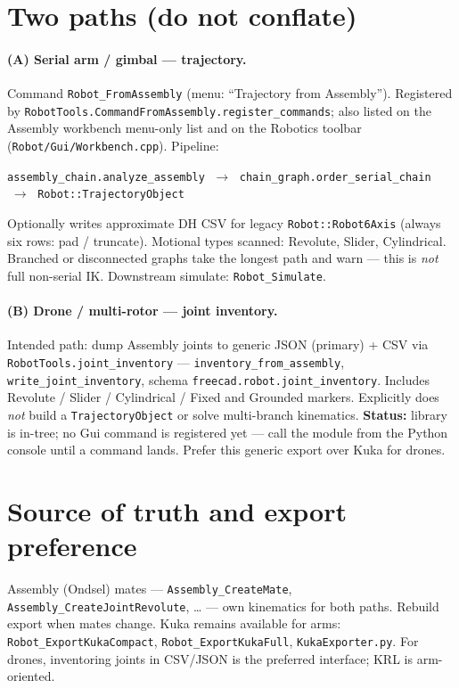 \section*{Two paths (do not conflate)}

\paragraph{(A) Serial arm / gimbal --- trajectory.}
Command \texttt{Robot\_FromAssembly} (menu: ``Trajectory from Assembly''). Registered by \texttt{RobotTools.CommandFromAssembly.register\_commands}; also listed on the Assembly workbench menu-only list and on the Robotics toolbar (\texttt{Robot/Gui/Workbench.cpp}). Pipeline:
\begin{center}
\texttt{assembly\_chain.analyze\_assembly}
$\;\to\;$
\texttt{chain\_graph.order\_serial\_chain}
$\;\to\;$
\texttt{Robot::TrajectoryObject}
\end{center}
Optionally writes approximate DH CSV for legacy \texttt{Robot::Robot6Axis} (always six rows: pad / truncate). Motional types scanned: Revolute, Slider, Cylindrical. Branched or disconnected graphs take the longest path and warn --- this is \emph{not} full non-serial IK. Downstream simulate: \texttt{Robot\_Simulate}.

\paragraph{(B) Drone / multi-rotor --- joint inventory.}
Intended path: dump Assembly joints to generic JSON (primary) + CSV via \texttt{RobotTools.joint\_inventory} --- \texttt{inventory\_from\_assembly}, \texttt{write\_joint\_inventory}, schema \texttt{freecad.robot.joint\_inventory}. Includes Revolute / Slider / Cylindrical / Fixed and Grounded markers. Explicitly does \emph{not} build a \texttt{TrajectoryObject} or solve multi-branch kinematics. \textbf{Status:} library is in-tree; no Gui command is registered yet --- call the module from the Python console until a command lands. Prefer this generic export over Kuka for drones.

\section*{Source of truth and export preference}

Assembly (Ondsel) mates --- \texttt{Assembly\_CreateMate}, \texttt{Assembly\_CreateJointRevolute}, \ldots{} --- own kinematics for both paths. Rebuild export when mates change. Kuka remains available for arms: \texttt{Robot\_ExportKukaCompact}, \texttt{Robot\_ExportKukaFull}, \texttt{KukaExporter.py}. For drones, inventoring joints in CSV/JSON is the preferred interface; KRL is arm-oriented.

